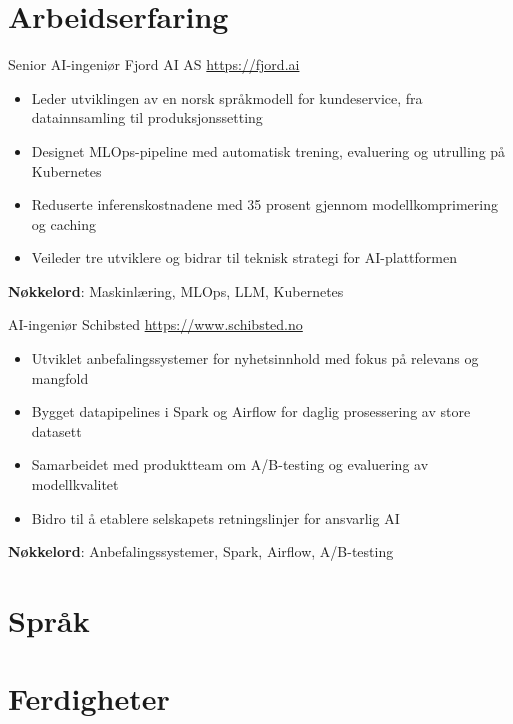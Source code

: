 \documentclass[a4paper, serif, 10pt]{moderncv}
\begin{document}
\section{Arbeidserfaring}

        {Senior AI-ingeniør}
        {Fjord AI AS}
        {\url{https://fjord.ai}}
        {}
        {\begin{itemize}
\item Leder utviklingen av en norsk språkmodell for kundeservice, fra datainnsamling til produksjonssetting
\item Designet MLOps-pipeline med automatisk trening, evaluering og utrulling på Kubernetes
\item Reduserte inferenskostnadene med 35 prosent gjennom modellkomprimering og caching
\item Veileder tre utviklere og bidrar til teknisk strategi for AI-plattformen
\end{itemize}
\textbf{Nøkkelord}: Maskinlæring, MLOps, LLM, Kubernetes}

        {AI-ingeniør}
        {Schibsted}
        {\url{https://www.schibsted.no}}
        {}
        {\begin{itemize}
\item Utviklet anbefalingssystemer for nyhetsinnhold med fokus på relevans og mangfold
\item Bygget datapipelines i Spark og Airflow for daglig prosessering av store datasett
\item Samarbeidet med produktteam om A/B-testing og evaluering av modellkvalitet
\item Bidro til å etablere selskapets retningslinjer for ansvarlig AI
\end{itemize}
\textbf{Nøkkelord}: Anbefalingssystemer, Spark, Airflow, A/B-testing}
\section{Språk}

\section{Ferdigheter}

\end{document}

